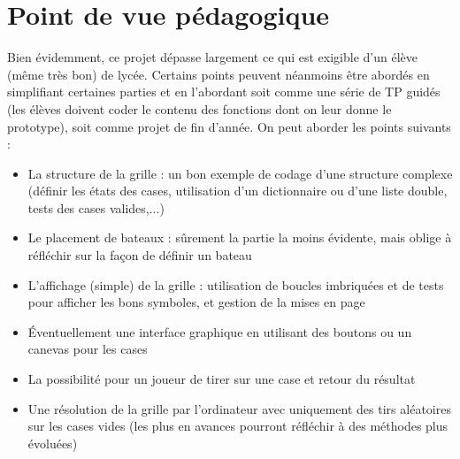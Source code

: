 \chapter{Point de vue pédagogique}

Bien évidemment, ce projet dépasse largement ce qui est exigible d'un élève (même très bon) de lycée. Certains points peuvent néanmoins être abordés en simplifiant certaines parties et en l'abordant soit comme une série de TP guidés (les élèves doivent coder le contenu des fonctions dont on leur donne le prototype), soit comme projet de fin d'année. On peut aborder les points suivants :
\begin{itemize}
\item La structure de la grille : un bon exemple de codage d'une structure complexe (définir les états des cases, utilisation d'un dictionnaire ou d'une liste double, tests des cases valides,...)
\item Le placement de bateaux : sûrement la partie la moins évidente, mais oblige à réfléchir sur la façon de définir un bateau 
\item L'affichage (simple) de la grille : utilisation de boucles imbriquées et de tests pour afficher les bons symboles, et gestion de la mises en page
\item Éventuellement une interface graphique en utilisant des boutons ou un canevas pour les cases
\item La possibilité pour un joueur de tirer sur une case et retour du résultat
\item Une résolution de la grille par l'ordinateur avec uniquement des tirs aléatoires sur les cases vides (les plus en avances pourront réfléchir à des méthodes plus évoluées)
\end{itemize}

